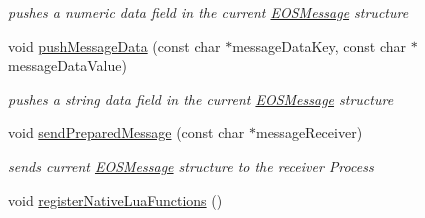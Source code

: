 \begin{CompactItemize}
\begin{CompactList}\small\item\em pushes a numeric data field in the current \hyperlink{classEOSMessage}{EOSMessage} structure \item\end{CompactList}\item 
void \hyperlink{structEOSKernel_3e7745d89db284ffa185b399a88ff8e5}{pushMessageData} (const char $\ast$messageDataKey, const char $\ast$messageDataValue)
\begin{CompactList}\small\item\em pushes a string data field in the current \hyperlink{classEOSMessage}{EOSMessage} structure \item\end{CompactList}\item 
void \hyperlink{structEOSKernel_f515d2bca73d1c3eed643605274bc3c2}{sendPreparedMessage} (const char $\ast$messageReceiver)
\begin{CompactList}\small\item\em sends current \hyperlink{classEOSMessage}{EOSMessage} structure to the receiver Process \item\end{CompactList}\item 
void \hyperlink{structEOSKernel_9d3dac36c51293a2d55b5ccd55411fe1}{registerNativeLuaFunctions} ()
\end{CompactItemize}
